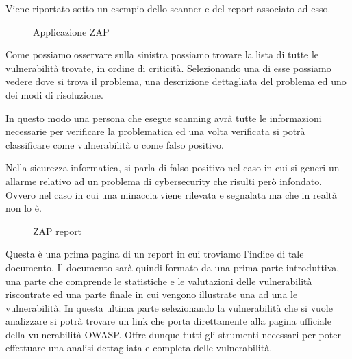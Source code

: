 Viene riportato sotto un esempio dello scanner e del report associato ad esso.
\begin{figure}[H]
    \caption{Applicazione ZAP}
    \label{fig:zap}
\end{figure}
Come possiamo osservare sulla sinistra possiamo trovare la lista di tutte le vulnerabilità trovate, in ordine di criticità. Selezionando una di esse possiamo vedere dove si trova il problema, una descrizione dettagliata del problema ed uno dei modi di risoluzione. 

In questo modo una persona che esegue scanning avrà tutte le informazioni necessarie per verificare la problematica ed una volta verificata si potrà classificare come vulnerabilità o come falso positivo. 

Nella sicurezza informatica, si parla di falso positivo nel caso in cui si generi un allarme relativo ad un problema di cybersecurity che risulti però infondato. Ovvero nel caso in cui una minaccia viene rilevata e segnalata ma che in realtà non lo è.
\begin{figure}[H]
    \caption{ZAP report}
    \label{fig:report}
\end{figure}
Questa è una prima pagina di un report in cui troviamo l’indice di tale documento. Il documento sarà quindi formato da una prima parte introduttiva, una parte che comprende le statistiche e le valutazioni delle vulnerabilità riscontrate ed una parte finale in cui vengono illustrate una ad una le vulnerabilità. In questa ultima parte selezionando la vulnerabilità che si vuole analizzare si potrà trovare un link che porta direttamente alla pagina ufficiale della vulnerabilità OWASP. 
Offre dunque tutti gli strumenti necessari per poter effettuare una analisi dettagliata e completa delle vulnerabilità. 
\cite{OWASP_ZAP}
